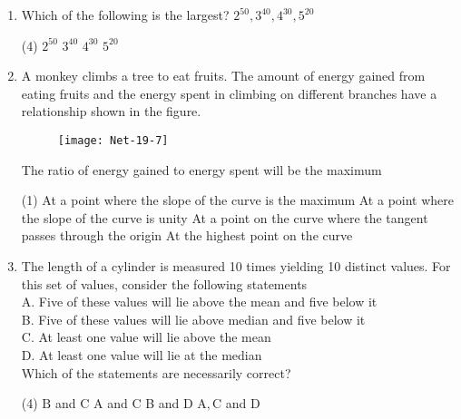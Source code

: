\begin{enumerate}
\begin{figure}[H]
	\centering
	\texttt{[image: Net-19-6]}
\end{figure}
The capacity of the box $\left(\mathrm{in} \mathrm{cm}^{3}\right)$ is
 \begin{tasks}(4)
\end{tasks}
\item  Which of the following is the largest?
$
2^{50}, 3^{40}, 4^{30}, 5^{20}
$
 \begin{tasks}(4)
	\task[\textbf{a.}] $2^{50}$
	\task[\textbf{b.}]$3^{40}$
	\task[\textbf{c.}]$4^{30}$
	\task[\textbf{d.}]$5^{20}$ 
\end{tasks}
\item  A monkey climbs a tree to eat fruits. The amount of energy gained from eating fruits and the energy spent in climbing on different branches have a relationship shown in the figure.
\begin{figure}[H]
	\centering
	\texttt{[image: Net-19-7]}
\end{figure}
The ratio of energy gained to energy spent will be the maximum
 \begin{tasks}(1)
	\task[\textbf{a.}] At a point where the slope of the curve is the maximum
	\task[\textbf{b.}] At a point where the slope of the curve is unity
	\task[\textbf{c.}]At a point on the curve where the tangent passes through the origin
	\task[\textbf{d.}] At the highest point on the curve
\end{tasks}
\item  The length of a cylinder is measured 10 times yielding 10 distinct values. For this set of values, consider the following statements\\
A. Five of these values will lie above the mean and five below it\\
B. Five of these values will lie above median and five below it\\
C. At least one value will lie above the mean\\
D. At least one value will lie at the median\\
Which of the statements are necessarily correct?
 \begin{tasks}(4)
	\task[\textbf{a.}] $\mathrm{B}$ and $\mathrm{C}$
	\task[\textbf{b.}] $\mathrm{A}$ and $\mathrm{C}$
	\task[\textbf{c.}] B and D
	\task[\textbf{d.}]$\mathrm{A}, \mathrm{C}$ and $\mathrm{D}$ 
\end{tasks}

\end{enumerate}
